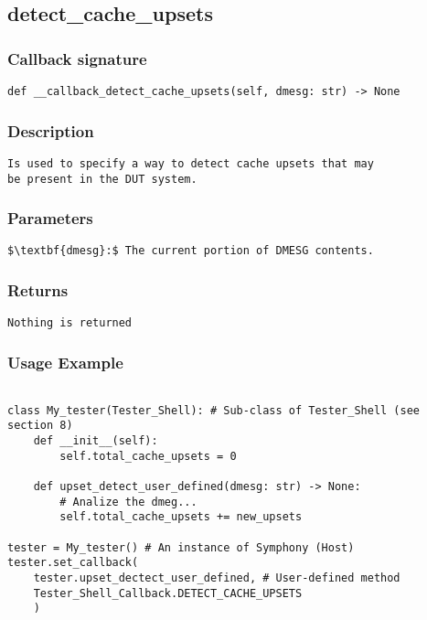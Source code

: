 \subsection{detect\_cache\_upsets}

\subsubsection{Callback signature}
\begin{lstlisting}
def __callback_detect_cache_upsets(self, dmesg: str) -> None
\end{lstlisting}

\subsubsection{Description}
\begin{lstlisting}[mathescape=true, keywordstyle=\color{black}, showstringspaces=false]
Is used to specify a way to detect cache upsets that may 
be present in the DUT system.
\end{lstlisting}

\subsubsection{Parameters}
\begin{lstlisting}[mathescape=true, keywordstyle=\color{black}]
$\textbf{dmesg}:$ The current portion of DMESG contents.
\end{lstlisting}

\subsubsection{Returns}
\begin{lstlisting}[mathescape=true, keywordstyle=\color{black}]
Nothing is returned
\end{lstlisting}


\subsubsection{Usage Example}
\begin{lstlisting}

class My_tester(Tester_Shell): # Sub-class of Tester_Shell (see section 8)
    def __init__(self):
        self.total_cache_upsets = 0

    def upset_detect_user_defined(dmesg: str) -> None:
        # Analize the dmeg...
        self.total_cache_upsets += new_upsets

tester = My_tester() # An instance of Symphony (Host)
tester.set_callback(
    tester.upset_dectect_user_defined, # User-defined method
    Tester_Shell_Callback.DETECT_CACHE_UPSETS
    )

\end{lstlisting}
